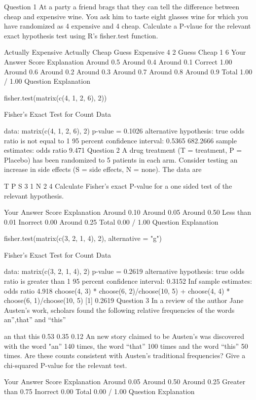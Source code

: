 Question 1
At a party a friend brags that they can tell the difference between cheap and expensive wine. You ask him to taste eight glasses wine for which you have randomized as 4 expensive and 4 cheap. Calculate a P-vlaue for the relevant exact hypothesis test using R's fisher.test function.

Actually Expensive	Actually Cheap
Guess Expensive	4	2
Guess Cheap	1	6
Your Answer		Score	Explanation
Around 0.5			
Around 0.4			
Around 0.1	Correct	1.00	
Around 0.6			
Around 0.2			
Around 0.3			
Around 0.7			
Around 0.8			
Around 0.9			
Total		1.00 / 1.00	
Question Explanation

fisher.test(matrix(c(4, 1, 2, 6), 2))

    Fisher's Exact Test for Count Data

data:  matrix(c(4, 1, 2, 6), 2) 
p-value = 0.1026
alternative hypothesis: true odds ratio is not equal to 1 
95 percent confidence interval:
   0.5365 682.2666 
sample estimates:
odds ratio 
     9.471 
Question 2
A drug treatment (T = treatment, P = Placebo) has been randomized to 5 patients in each arm. Consider testing an increase in side effects (S = side effects, N = none). The data are

T	P
S	3	1
N	2	4
Calculate Fisher's exact P-value for a one sided test of the relevant hypothesis.

Your Answer		Score	Explanation
Around 0.10			
Around 0.05			
Around 0.50			
Less than 0.01	Inorrect	0.00	
Around 0.25			
Total		0.00 / 1.00	
Question Explanation

fisher.test(matrix(c(3, 2, 1, 4), 2), alternative = "g")

    Fisher's Exact Test for Count Data

data:  matrix(c(3, 2, 1, 4), 2)
p-value = 0.2619
alternative hypothesis: true odds ratio is greater than 1
95 percent confidence interval:
 0.3152    Inf
sample estimates:
odds ratio 
     4.918 
{
    choose(4, 3) * choose(6, 2)/choose(10, 5) + choose(4, 4) * choose(6, 1)/choose(10, 
        5)
}
[1] 0.2619
Question 3
In a review of the author Jane Austen's work, scholars found the following relative frequencies of the words an'',that'' and “this''

an	that	this
0.53	0.35	0.12
An new story claimed to be Austen's was discovered with the word "an” 140 times, the word “that” 100 times and the word “this” 50 times. Are these counts consistent with Austen's traditional frequencies? Give a chi-squared P-value for the relevant test.

Your Answer		Score	Explanation
Around 0.05			
Around 0.50			
Around 0.25			
Greater than 0.75	Inorrect	0.00	
Total		0.00 / 1.00	
Question Explanation

